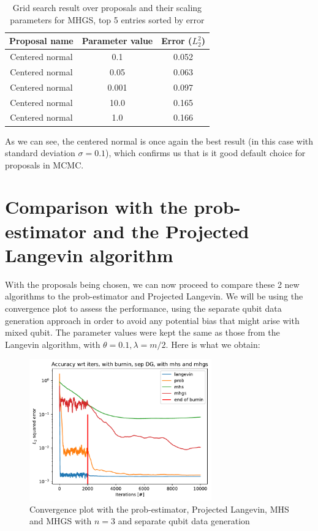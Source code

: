 \documentclass[12pt]{memoir}
\begin{document}
\begin{table}[H]

    \begin{center}
        \begin{tabular}{|c|c|c|}
            \hline
            Proposal name & Parameter value & Error ($L_2^2$)\\
            \hline\hline
            Centered normal& 0.1&0.052\\
            Centered normal& 0.05&0.063\\
            Centered normal& 0.001&0.097\\
            Centered normal& 10.0&0.165\\
            Centered normal& 1.0&0.166\\\hline
        \end{tabular}
\end{center}
\caption{Grid search result over proposals and their scaling parameters for MHGS, top 5 entries sorted by error}
\label{table:proposal-grid-search-mhgs}
\end{table}
As we can see, the centered normal is once again the best result (in this case with standard deviation $\sigma=0.1$), which confirms us that is it good default choice for proposals in MCMC.

\section{Comparison with the prob-estimator and the Projected Langevin algorithm}\label{section:mhs-mhgs-num-exp}
With the proposals being chosen, we can now proceed to compare these 2 new algorithms to the prob-estimator and Projected Langevin. We will be using the convergence plot to assess the performance, using the separate qubit data generation approach in order to avoid any potential bias that might arise with mixed qubit. The parameter values were kept the same as those from the Langevin algorithm, with $\theta=0.1,\lambda=m/2$. Here is what we obtain:\medbreak

\begin{figure}[H]
    \centering
    \includegraphics[width=0.7\textwidth]{figures/experiments/mhs_mhgs/iters_acc_comp_iters_no_avg_sep_prob_pl_mhs_mhgs-1.png}
    \caption{Convergence plot with the prob-estimator, Projected Langevin, MHS and MHGS with $n=3$ and separate qubit data generation}
    \label{fig:mhs-mhgs-conv-plot}
\end{figure}
\end{document}

